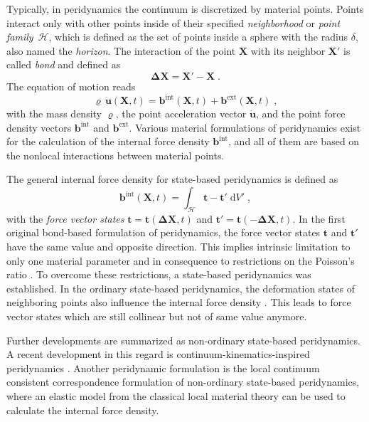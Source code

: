 \documentclass{juliacon}
\newcommand{\vb}{\boldsymbol}
\begin{document}
Typically, in peridynamics the continuum is discretized by material points.
Points interact only with other points inside of their specified \emph{neighborhood} or \emph{point family}~$\mathcal{H}$, which is defined as the set of points inside a sphere with the radius $\delta$, also named the \emph{horizon}.
The interaction of the point $\vb{X}$ with its neighbor $\vb{X}'$ is called \emph{bond} and defined as
\begin{equation}
\vb{\Delta X} = \vb{X}' - \vb{X} \; .
\end{equation}
The equation of motion reads
\begin{equation}
\varrho \, \vb{\ddot{u}}(\vb{X},t) = \vb{b}^{\mathrm{int}}(\vb{X},t) + \vb{b}^{\mathrm{ext}}(\vb{X},t) \; ,
\end{equation} 
with the mass density $\varrho$, the point acceleration vector $\vb{\ddot{u}}$, and the point force density vectors $\vb{b}^{\mathrm{int}}$ and $\vb{b}^{\mathrm{ext}}$.
Various material formulations of peridynamics exist for the calculation of the internal force density $\vb{b}^{\mathrm{int}}$, and all of them are based on the nonlocal interactions between material points.

The general internal force density for state-based peridynamics is defined as
\begin{equation}
\vb{b}^{\mathrm{int}} (\vb{X},t) = \int_\mathcal{H} \vb{t} - \vb{t}' \; \mathrm{d}V' \; ,
\end{equation}
with the \emph{force vector states} $\vb{t}=\vb{t}(\vb{\Delta X}, t)$ and $\vb{t}'=\vb{t}(-\vb{\Delta X}, t)$.
In the first original bond-based formulation of peridynamics, the force vector states $\vb{t}$ and  $\vb{t}'$ have the same value and opposite direction.
This implies intrinsic limitation to only one material parameter and in consequence to restrictions on the Poisson's ratio \cite{Silling2007,Trageser2020}.
To overcome these restrictions, a state-based peridynamics was established.
In the ordinary state-based peridynamics, the deformation states of neighboring points also influence the internal force density \cite{Silling2007}.
This leads to force vector states which are still collinear but not of same value anymore.

Further developments are summarized as non-ordinary state-based peridynamics.
A recent development in this regard is continuum-kinematics-inspired peridynamics \cite{Javili2019}.
Another peridynamic formulation is the local continuum consistent correspondence formulation of non-ordinary state-based peridynamics, where an elastic model from the classical local material theory can be used to calculate the internal force density.
\end{document}
